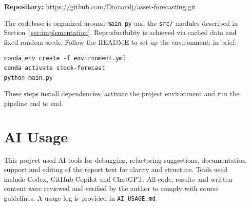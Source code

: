 \documentclass[11pt,a4paper]{article}
\begin{document}
\noindent
\textbf{Repository:} \url{https://github.com/Dionavdj/asset-forecasting.git}

\noindent
The codebase is organized around \texttt{main.py} and the \texttt{src/} modules described in Section~\ref{sec:implementation}. Reproducibility is achieved via cached data and fixed random seeds. Follow the README to set up the environment; in brief:
\begin{verbatim}
conda env create -f environment.yml
conda activate stock-forecast
python main.py
\end{verbatim}
These steps install dependencies, activate the project environment and run the pipeline end to end.

\section{AI Usage}
\label{app:ai}

This project used AI tools for debugging, refactoring suggestions, documentation support and editing of the report text for clarity and structure. Tools used include Codex, GitHub Copilot and ChatGPT. All code, results and written content were reviewed and verified by the author to comply with course guidelines. A usage log is provided in \texttt{AI\_USAGE.md}.
\end{document}
